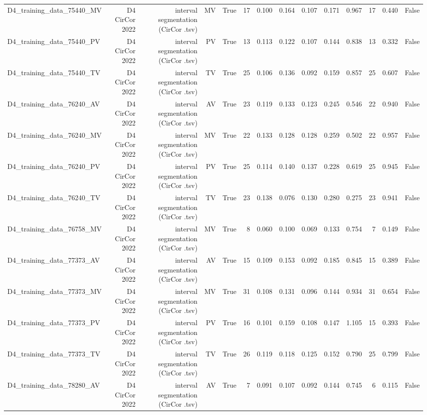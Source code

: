 \begin{table}[htbp]
\begin{tabular}{lrrrrrrrrrrrrr}
    D4\_training\_data\_75440\_MV & D4 CirCor 2022 & interval segmentation (CirCor .tsv) & MV & True & 17 & 0.100 & 0.164 & 0.107 & 0.171 & 0.967 & 17 & 0.440 & False \\
    D4\_training\_data\_75440\_PV & D4 CirCor 2022 & interval segmentation (CirCor .tsv) & PV & True & 13 & 0.113 & 0.122 & 0.107 & 0.144 & 0.838 & 13 & 0.332 & False \\
    D4\_training\_data\_75440\_TV & D4 CirCor 2022 & interval segmentation (CirCor .tsv) & TV & True & 25 & 0.106 & 0.136 & 0.092 & 0.159 & 0.857 & 25 & 0.607 & False \\
    D4\_training\_data\_76240\_AV & D4 CirCor 2022 & interval segmentation (CirCor .tsv) & AV & True & 23 & 0.119 & 0.133 & 0.123 & 0.245 & 0.546 & 22 & 0.940 & False \\
    D4\_training\_data\_76240\_MV & D4 CirCor 2022 & interval segmentation (CirCor .tsv) & MV & True & 22 & 0.133 & 0.128 & 0.128 & 0.259 & 0.502 & 22 & 0.957 & False \\
    D4\_training\_data\_76240\_PV & D4 CirCor 2022 & interval segmentation (CirCor .tsv) & PV & True & 25 & 0.114 & 0.140 & 0.137 & 0.228 & 0.619 & 25 & 0.945 & False \\
    D4\_training\_data\_76240\_TV & D4 CirCor 2022 & interval segmentation (CirCor .tsv) & TV & True & 23 & 0.138 & 0.076 & 0.130 & 0.280 & 0.275 & 23 & 0.941 & False \\
    D4\_training\_data\_76758\_MV & D4 CirCor 2022 & interval segmentation (CirCor .tsv) & MV & True & 8 & 0.060 & 0.100 & 0.069 & 0.133 & 0.754 & 7 & 0.149 & False \\
    D4\_training\_data\_77373\_AV & D4 CirCor 2022 & interval segmentation (CirCor .tsv) & AV & True & 15 & 0.109 & 0.153 & 0.092 & 0.185 & 0.845 & 15 & 0.389 & False \\
    D4\_training\_data\_77373\_MV & D4 CirCor 2022 & interval segmentation (CirCor .tsv) & MV & True & 31 & 0.108 & 0.131 & 0.096 & 0.144 & 0.934 & 31 & 0.654 & False \\
    D4\_training\_data\_77373\_PV & D4 CirCor 2022 & interval segmentation (CirCor .tsv) & PV & True & 16 & 0.101 & 0.159 & 0.108 & 0.147 & 1.105 & 15 & 0.393 & False \\
    D4\_training\_data\_77373\_TV & D4 CirCor 2022 & interval segmentation (CirCor .tsv) & TV & True & 26 & 0.119 & 0.118 & 0.125 & 0.152 & 0.790 & 25 & 0.799 & False \\
    D4\_training\_data\_78280\_AV & D4 CirCor 2022 & interval segmentation (CirCor .tsv) & AV & True & 7 & 0.091 & 0.107 & 0.092 & 0.144 & 0.745 & 6 & 0.115 & False \\

\end{tabular}
\end{table}
